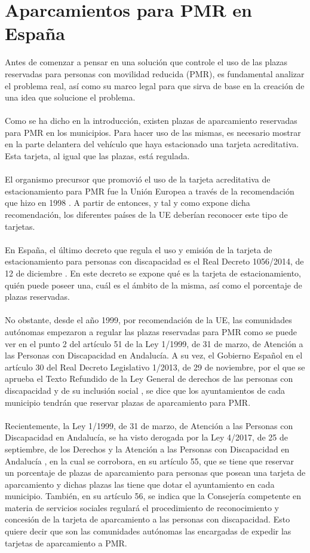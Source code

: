 \chapter{Aparcamientos para PMR en España}
Antes de comenzar a pensar en una solución que controle el uso de las plazas reservadas para personas con movilidad reducida (PMR), es fundamental analizar el problema real, así como su marco legal para que sirva de base en la creación de una idea que solucione el problema.
\\\\
Como se ha dicho en la introducción, existen plazas de aparcamiento reservadas para PMR en los municipios. Para hacer uso de las mismas, es necesario mostrar en la parte delantera del vehículo que haya estacionado una tarjeta acreditativa. Esta tarjeta, al igual que las plazas, está regulada.
\\\\
El organismo precursor que promovió el uso de la tarjeta acreditativa de estacionamiento para PMR fue la Unión Europea a través de la recomendación que hizo en 1998 \cite{ue-98}. A partir de entonces, y tal y como expone dicha recomendación, los diferentes países de la UE deberían reconocer este tipo de tarjetas.
\\\\
En España, el último decreto que regula el uso y emisión de la tarjeta de estacionamiento para personas con discapacidad es el Real Decreto 1056/2014, de 12 de diciembre \cite{rd1056-2014}. En este decreto se expone qué es la tarjeta de estacionamiento, quién puede poseer una, cuál es el ámbito de la misma, así como el porcentaje de plazas reservadas.
\\\\
No obstante, desde el año 1999, por recomendación de la UE, las comunidades autónomas empezaron a regular las plazas reservadas para PMR como se puede ver en el punto 2 del artículo 51 de la Ley 1/1999, de 31 de marzo, de Atención a las Personas con Discapacidad en Andalucía. A su vez, el Gobierno Español en el artículo 30 del Real Decreto Legislativo 1/2013, de 29 de noviembre, por el que se aprueba el Texto Refundido de la Ley General de derechos de las personas con discapacidad y de su inclusión social \cite{rdl1-2013}, se dice que los ayuntamientos de cada municipio tendrán que reservar plazas de aparcamiento para PMR.
\\\\
Recientemente, la Ley 1/1999, de 31 de marzo, de Atención a las Personas con Discapacidad en Andalucía, se ha visto derogada por la Ley 4/2017, de 25 de septiembre, de los Derechos y la Atención a las Personas con Discapacidad en Andalucía \cite{l4-2017}, en la cual se corrobora, en su artículo 55, que se tiene que reservar un porcentaje de plazas de aparcamiento para personas que posean una tarjeta de aparcamiento y dichas plazas las tiene que dotar el ayuntamiento en cada municipio. También, en su artículo 56, se indica que la Consejería competente en materia de servicios sociales regulará el procedimiento de reconocimiento y concesión de la tarjeta de aparcamiento a las personas con discapacidad. Esto quiere decir que son las comunidades autónomas las encargadas de expedir las tarjetas de aparcamiento a PMR.
